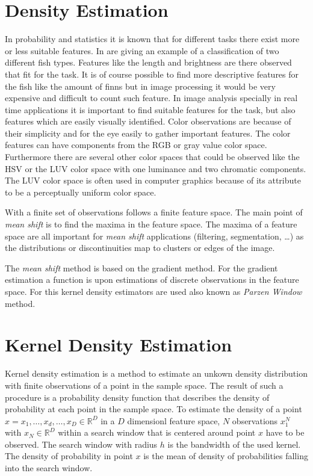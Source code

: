 \section{Density Estimation} %
\label{sec:density_estimation}
In probability and statistics it is known that for different tasks there exist
more or less suitable features. In \citeauthor{citeulike:167581}
\citep{citeulike:167581} are giving an example of a classification of two
different fish types. Features like the length and brightness are there observed
that fit for the task. It is of course possible to find more descriptive
features for the fish like the amount of finns but in image processing it would
be very expensive and difficult to count such feature. In image analysis
specially in real time applications it is important to find suitable features
for the task, but also features which are easily visually identified. Color
observations are because of their simplicity and for the eye easily to gather
important features. The color features can have components from the \gls{RGB} or
gray value color space. Furthermore there are several other color spaces that
could be observed like the \gls{HSV} or the \gls{LUV} color space with one
luminance and two chromatic components. The \gls{LUV} color space is often used
in computer graphics because of its attribute to be a perceptually uniform color
space.

With a finite set of observations follows a finite feature space. The main point
of \emph{mean shift} is to find the maxima in the feature space. The maxima of a
feature space are all important for \emph{mean shift} applications
(filtering, segmentation, \ldots) as the distributions or discontinuities map to
clusters or edges of the image.

The \emph{mean shift} method is based on the gradient method. For the gradient
estimation a function is upon estimations of discrete observations in the
feature space. For this kernel density estimators are used also known as 
\emph{Parzen Window} method.

\section{Kernel Density Estimation} %
\label{sec:kernel_density_estimation}
Kernel density estimation is a method to estimate an unkown density
distribution with finite observations of a point in the sample space. 
The result of such a procedure is a probability density function that describes 
the density of probability at each point in the sample space. To estimate the 
density of a point $x = { x_1, \ldots , x_d, \ldots , x_D} \in \mathbb{R}^D$ in a 
$D$ dimensionl feature space, $N$ observations $x_1^N$ with
 $x_N \in \mathbb{R}^D$ within a search window that is centered around point $x$
have to be observed. The search window with radius $h$ is the bandwidth of the
used kernel. The density of probability in point $x$ is the mean of density of
{\color{Maroon}probabilities falling into the search window.}

